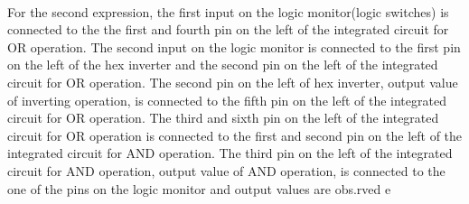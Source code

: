 \documentclass[pdftex,12pt,a4paper]{article}
\begin{document}
\begin{flushleft}
\paragraph{}
For the second expression, the first input on the logic monitor(logic switches) is connected to the the first and fourth pin on the left of the integrated circuit for OR operation. The second input on the logic monitor is connected to the first pin on the left of the hex inverter and the second pin on the left of the integrated circuit for OR operation. The second pin on the left of hex inverter, output value of inverting operation, is connected to the fifth pin on the left of the integrated circuit for OR operation. The third and sixth pin on the left of the integrated circuit for OR operation is connected to the first and second pin on the left of the integrated circuit for AND operation. The third pin on the left of the integrated circuit for AND operation, output value of AND operation, is connected to the one of the pins on the logic monitor and output values are obs.rved
e\end{flushleft}
\end{document}
